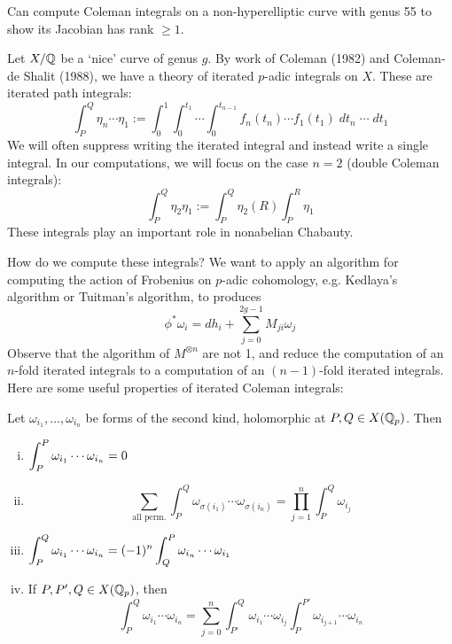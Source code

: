 \begin{ex}
Can compute Coleman integrals on a non-hyperelliptic curve with genus 55 to show its Jacobian has rank $\geq 1$. \xqed
\end{ex}


Let $X/\mathbb{Q}$ be a `nice' curve of genus $g$. By work of Coleman (1982) and Coleman-de Shalit (1988), we have a theory of iterated $p$-adic integrals on $X$. These are iterated path integrals:
	\[
	\int_P^Q \eta_n \cdots \eta_1:= \int_0^1 \int_0^{t_1} \cdots \int_0^{t_{n-1}} f_n(t_n) \cdots f_1(t_1) \;dt_n \; \cdots \; dt_1
	\]
We will often suppress writing the iterated integral and instead write a single integral. In our computations, we will focus on the case $n=2$ (double Coleman integrals):
	\[
	\int_P^Q \eta_2 \eta_1:= \int_P^Q \eta_2(R) \int_P^R \eta_1
	\]
These integrals play an important role in nonabelian Chabauty.


How do we compute these integrals? We want to apply an algorithm for computing the action of Frobenius on $p$-adic cohomology, e.g. Kedlaya's algorithm or Tuitman's algorithm, to produces
	\[
	\phi^* \omega_i= dh_i + \sum_{j=0}^{2g-1} M_{ji} \omega_j
	\]
Observe that the algorithm of $M^{\otimes n}$ are not 1, and reduce the computation of an $n$-fold iterated integrals to a computation of an $(n-1)$-fold iterated integrals. Here are some useful properties of iterated Coleman integrals:


\begin{prop}
Let $\omega_{i_1}, \ldots, \omega_{i_n}$ be forms of the second kind, holomorphic at $P,Q \in X(\mathbb{Q}_p)$. Then

\begin{enumerate}[(i)]
\item $\displaystyle\int_P^P \omega_{i_1} \cdots \omega_{i_n}= 0$
\item
	\[
	\sum_{\text{all perm.}} \int_P^Q \omega_{\sigma(i_1)} \cdots \omega_{\sigma(i_n)}= \prod_{j=1}^n \int_P^Q \omega_{i_j}
	\]
\item $\displaystyle\int_P^Q \omega_{i_1} \cdots \omega_{i_n}= (-1)^n \int_Q^P \omega_{i_n} \cdots \omega_{i_1}$
\item If $P,P', Q \in X(\mathbb{Q}_p)$, then
	\[
	\int_P^Q \omega_{i_1} \cdots \omega_{i_n}= \sum_{j=0}^n \int_{P'}^Q \omega_{i_1} \cdots \omega_{i_j} \int_P^{P'} \omega_{i_{j+1}} \cdots \omega_{i_n}
	\]
\end{enumerate}
\end{prop}



